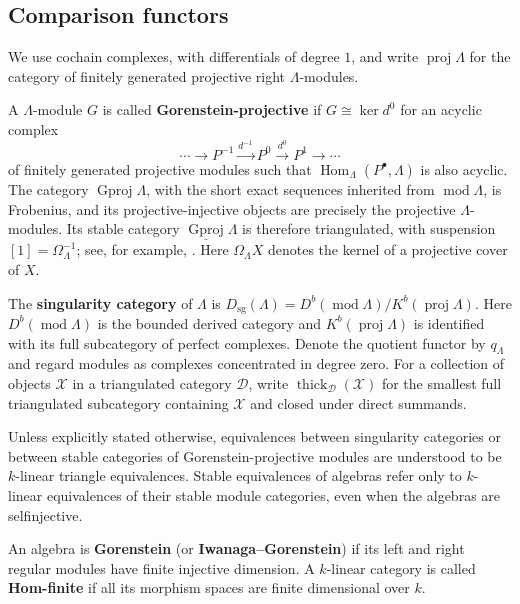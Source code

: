 \documentclass[11pt]{article}
\newcommand{\Hom}{\operatorname{Hom}}
\renewcommand{\mod}{\operatorname{mod}}
\providecommand{\varLambda}{\Lambda}
\theoremstyle{definition}
\begin{document}
	\subsection{Comparison functors}\label{subsection of stable and singularity categories}


		We use cochain complexes, with differentials of degree $1$, and write $\operatorname{proj}\varLambda$ for the category of finitely generated projective right $\varLambda$-modules.

		A $\varLambda$-module $G$ is called \textbf{Gorenstein-projective} if $G\cong\ker d^0$ for an acyclic complex
		\[
			\cdots\longrightarrow P^{-1}\xrightarrow{d^{-1}}P^0\xrightarrow{d^0}P^1\longrightarrow\cdots
		\]
		of finitely generated projective modules such that $\Hom_{\varLambda}(P^\bullet,\varLambda)$ is also acyclic. The category $\operatorname{Gproj}\varLambda$, with the short exact sequences inherited from $\mod\varLambda$, is Frobenius, and its projective-injective objects are precisely the projective $\varLambda$-modules. Its stable category $\underline{\operatorname{Gproj}}\varLambda$ is therefore triangulated, with suspension $[1]=\Omega_{\varLambda}^{-1}$; see, for example, \cite[Proposition~2.1.11 and Remark~2.1.12]{Che17}. Here $\Omega_{\varLambda}X$ denotes the kernel of a projective cover of $X$.

		The \textbf{singularity category} of $\varLambda$ is $D_{\mathrm{sg}}(\varLambda)=D^b(\mod\varLambda)/K^b(\operatorname{proj}\varLambda).$
		Here $D^b(\mod\varLambda)$ is the bounded derived category and $K^b(\operatorname{proj}\varLambda)$ is identified with its full subcategory of perfect complexes. Denote the quotient functor by $q_{\varLambda}$ and regard modules as complexes concentrated in degree zero.
		For a collection of objects $\mathcal X$ in a triangulated category $\mathcal D$, write $\operatorname{thick}_{\mathcal D}(\mathcal X)$ for the smallest full triangulated subcategory containing $\mathcal X$ and closed under direct summands.

        Unless explicitly stated otherwise, equivalences between singularity categories or between stable categories of Gorenstein-projective modules are understood to be $k$-linear triangle equivalences. Stable equivalences of algebras refer only to $k$-linear equivalences of their stable module categories, even when the algebras are selfinjective.
        
        	An algebra is \textbf{Gorenstein} (or \textbf{Iwanaga--Gorenstein}) if its left and right regular modules have finite injective dimension.  A $k$-linear category is called \textbf{Hom-finite} if all its morphism spaces are finite dimensional over $k$.
\end{document}
